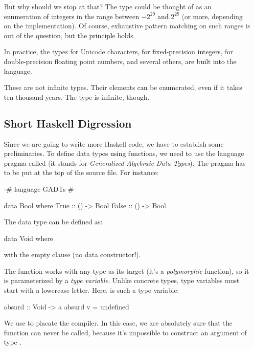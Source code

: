\documentclass[DaoFP]{subfiles}
\begin{document}
But why should we stop at that? The type  could be thought of as an enumeration of integers in the range between $-2^{29}$ and $2^{29}$ (or more, depending on the implementation). Of course, exhaustive pattern matching on such ranges is out of the question, but the principle holds. 

In practice, the types  for Unicode characters,  for fixed-precision integers,  for double-precision floating point numbers, and several others, are built into the language.

These are not infinite types. Their elements can be enumerated, even if it takes ten thousand years. The type  is infinite, though.

\subsection{Short Haskell Digression}

Since we are going to write more Haskell code, we have to establish some preliminaries. To define data types using functions, we need to use the language pragma called  (it stands for \emph{Generalized Algebraic Data Types}). The pragma has to be put at the top of the source file. For instance:

\begin{haskell}
{-# language GADTs #-}

data Bool where
  True  :: () -> Bool
  False :: () -> Bool
\end{haskell}

The  data type can be defined as:
\begin{haskell}
data Void where
\end{haskell}
with the empty  clause (no data constructor!).

The function  works with any type as its target (it's a \emph{polymorphic} function), so it is parameterized by a \emph{type variable}. Unlike concrete types, type variables must start with a lowercase letter. Here,  is such a type variable:

\begin{haskell}
absurd :: Void -> a
absurd v = undefined
\end{haskell}
We use  to placate the compiler. In this case, we are absolutely sure that the function  can never be called, because it's impossible to construct an argument of type .
\end{document}
